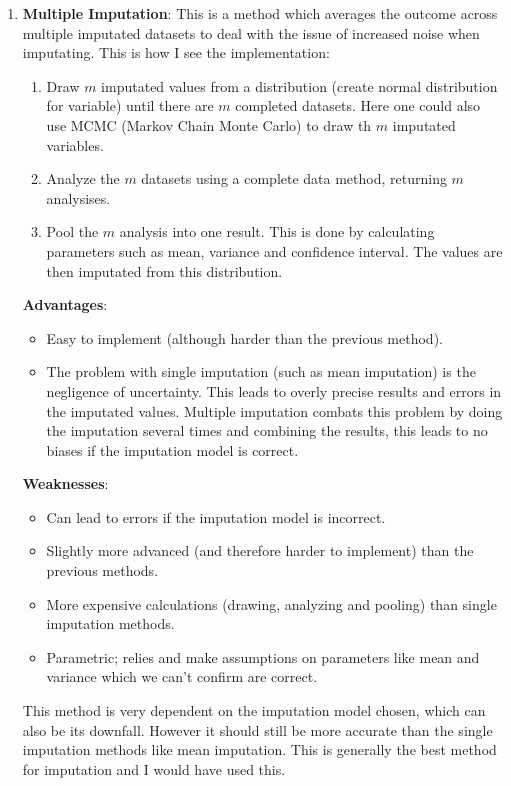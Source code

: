 \documentclass[11pt, english]{../Template/NTNUoving}
\begin{document}
\begin{oppgave}
\begin{enumerate}
        \item \textbf{Multiple Imputation}\cite{MI}: This is a method which averages the outcome across multiple imputated datasets to deal with the issue of increased noise when imputating.
        This is how I see the implementation:
        \begin{enumerate}[label=\arabic*]
            \item Draw $m$ imputated values from a distribution (create normal distribution for variable) until there are $m$ completed datasets. Here one could also use MCMC (Markov Chain Monte Carlo) \cite{MCMC} to draw th $m$ imputated variables.
            \item Analyze the $m$ datasets using a complete data method, returning $m$ analysises.
            \item Pool the $m$ analysis into one result. This is done by calculating parameters such as mean, variance and confidence interval. The values are then imputated from this distribution.
        \end{enumerate}
        \textbf{Advantages}:
        \begin{itemize}
            \item Easy to implement (although harder than the previous method).
            \item The problem with single imputation (such as mean imputation) is the negligence of uncertainty. This leads to overly precise results and errors in the imputated values.
            Multiple imputation combats this problem by doing the imputation several times and combining the results, this leads to no biases if the imputation model is correct.
        \end{itemize}
        \textbf{Weaknesses}:
        \begin{itemize}
            \item Can lead to errors if the imputation model is incorrect.
            \item Slightly more advanced (and therefore harder to implement) than the previous methods.
            \item More expensive calculations (drawing, analyzing and pooling) than single imputation methods.
            \item Parametric; relies and make assumptions on parameters like mean and variance which we can't confirm are correct.
        \end{itemize}
        This method is very dependent on the imputation model chosen, which can also be its downfall. However it should still be more accurate than the
        single imputation methods like mean imputation. This is generally the best method for imputation and I would have used this.
    \end{enumerate}
\end{oppgave}

\printbibliography
\end{document}
